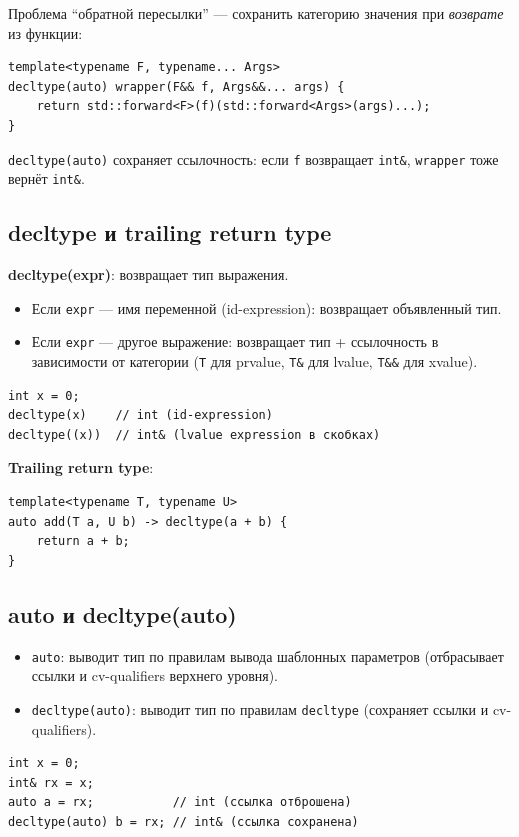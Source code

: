 \documentclass[12pt,a4paper]{article}
\begin{document}
Проблема ``обратной пересылки'' --- сохранить категорию значения при \textit{возврате} из функции:
\begin{lstlisting}
template<typename F, typename... Args>
decltype(auto) wrapper(F&& f, Args&&... args) {
    return std::forward<F>(f)(std::forward<Args>(args)...);
}
\end{lstlisting}
\texttt{decltype(auto)} сохраняет ссылочность: если \texttt{f} возвращает \texttt{int\&}, \texttt{wrapper} тоже вернёт \texttt{int\&}.

\subsection{decltype и trailing return type}

\textbf{decltype(expr)}: возвращает тип выражения.
\begin{itemize}
    \item Если \texttt{expr} --- имя переменной (id-expression): возвращает объявленный тип.
    \item Если \texttt{expr} --- другое выражение: возвращает тип + ссылочность в зависимости от категории (\texttt{T} для prvalue, \texttt{T\&} для lvalue, \texttt{T\&\&} для xvalue).
\end{itemize}

\begin{lstlisting}
int x = 0;
decltype(x)    // int (id-expression)
decltype((x))  // int& (lvalue expression в скобках)
\end{lstlisting}

\textbf{Trailing return type}:
\begin{lstlisting}
template<typename T, typename U>
auto add(T a, U b) -> decltype(a + b) {
    return a + b;
}
\end{lstlisting}

\subsection{auto и decltype(auto)}

\begin{itemize}
    \item \texttt{auto}: выводит тип по правилам вывода шаблонных параметров (отбрасывает ссылки и cv-qualifiers верхнего уровня).
    \item \texttt{decltype(auto)}: выводит тип по правилам \texttt{decltype} (сохраняет ссылки и cv-qualifiers).
\end{itemize}

\begin{lstlisting}
int x = 0;
int& rx = x;
auto a = rx;           // int (ссылка отброшена)
decltype(auto) b = rx; // int& (ссылка сохранена)
\end{lstlisting}
\end{document}
